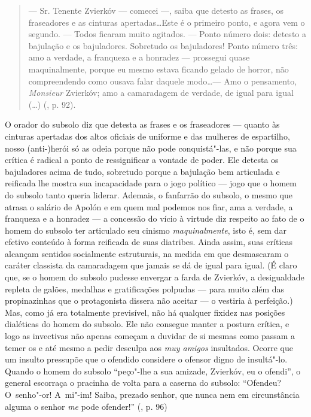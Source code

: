 \begin{quote}
--- Sr. Tenente Zvierkóv --- comecei ---, saiba que detesto as frases, os
fraseadores e as cinturas apertadas\ldots Este é o primeiro ponto, e agora
vem o segundo. --- Todos ficaram muito agitados. --- Ponto número dois:
detesto a bajulação e os bajuladores. Sobretudo os bajuladores! Ponto
número três: amo a verdade, a franqueza e a honradez --- prossegui quase
maquinalmente, porque eu mesmo estava ficando gelado de horror, não
compreendendo como ousava falar daquele modo\ldots --- Amo o pensamento,
\emph{Monsieur} Zvierkóv; amo a camaradagem de verdade, de igual para
igual (\ldots) (, p. 92).
\end{quote}

O orador do subsolo diz que detesta as frases e os fraseadores --- quanto
às cinturas apertadas dos altos oficiais de uniforme e das mulheres de
espartilho, nosso \mbox{(anti-)herói} só as odeia porque não pode
conquistá"-las, e não porque sua crítica é radical a ponto de
ressignificar a vontade de poder. Ele detesta os bajuladores acima de
tudo, sobretudo porque a bajulação bem articulada e reificada lhe mostra
sua incapacidade para o jogo político --- jogo que o homem do subsolo
tanto queria liderar. Ademais, o fanfarrão do subsolo, o mesmo que
atrasa o salário de Apolón e em quem mal podemos nos fiar, ama a
verdade, a franqueza e a honradez --- a concessão do vício à virtude diz
respeito ao fato de o homem do subsolo ter articulado seu cinismo
\emph{maquinalmente}, isto é, sem dar efetivo conteúdo à forma reificada
de suas diatribes. Ainda assim, suas críticas alcançam sentidos
socialmente estruturais, na medida em que desmascaram o caráter
classista da camaradagem que jamais se dá de igual para igual. (É claro
que, se o homem do subsolo pudesse envergar a farda de Zvierkóv, a
desigualdade repleta de galões, medalhas e gratificações polpudas ---
para muito além das propinazinhas que o protagonista dissera não aceitar
--- o vestiria à perfeição.) Mas, como já era totalmente previsível, não
há qualquer fixidez nas posições dialéticas do homem do subsolo. Ele não
consegue manter a postura crítica, e logo as invectivas não apenas
começam a duvidar de si mesmas como passam a temer os e até mesmo a
pedir desculpa aos \emph{muy amigos} insultados. Ocorre que um insulto
pressupõe que o ofendido considere o ofensor digno de insultá"-lo. Quando
o homem do subsolo ``peço"-lhe a sua amizade, Zvierkóv, eu o ofendi'', o
general escorraça o pracinha de volta para a caserna do subsolo:
``Ofendeu? O~senho"-or! A~mi"-im! Saiba, prezado senhor, que nunca nem em
circunstância alguma o senhor \emph{me} pode ofender!'' (, p. 96)

